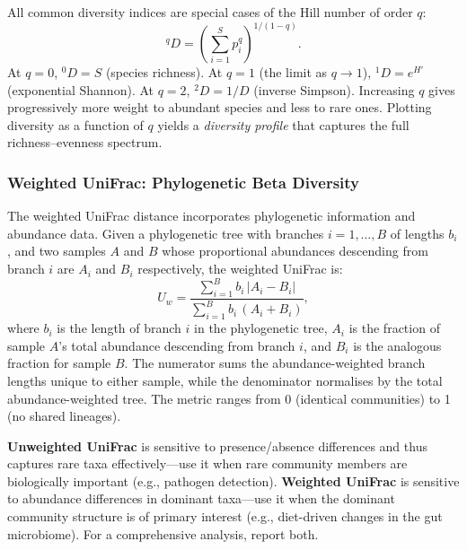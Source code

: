 \begin{keyconcept}[title={Hill Numbers: A Unified Diversity Framework}]
All common diversity indices are special cases of the Hill number of order $q$:
\begin{equation}
\label{eq:metagenomics:hill}
{}^{q}\!D = \left( \sum_{i=1}^{S} p_i^q \right)^{1/(1-q)}.
\end{equation}
At $q = 0$, ${}^{0}\!D = S$ (species richness). At $q = 1$ (the limit as $q \to 1$), ${}^{1}\!D = e^{H'}$ (exponential Shannon). At $q = 2$, ${}^{2}\!D = 1/D$ (inverse Simpson). Increasing $q$ gives progressively more weight to abundant species and less to rare ones. Plotting diversity as a function of $q$ yields a \emph{diversity profile} that captures the full richness--evenness spectrum.
\end{keyconcept}

\subsubsection{Weighted UniFrac: Phylogenetic Beta Diversity}

The weighted UniFrac distance incorporates phylogenetic information and abundance data. Given a phylogenetic tree with branches $i = 1, \ldots, B$ of lengths $b_i$, and two samples $A$ and $B$ whose proportional abundances descending from branch $i$ are $A_i$ and $B_i$ respectively, the weighted UniFrac is:
\begin{equation}
\label{eq:metagenomics:weighted_unifrac}
U_w = \frac{\sum_{i=1}^{B} b_i \, |A_i - B_i|}{\sum_{i=1}^{B} b_i \, (A_i + B_i)},
\end{equation}
where $b_i$ is the length of branch $i$ in the phylogenetic tree, $A_i$ is the fraction of sample $A$'s total abundance descending from branch $i$, and $B_i$ is the analogous fraction for sample $B$. The numerator sums the abundance-weighted branch lengths unique to either sample, while the denominator normalises by the total abundance-weighted tree. The metric ranges from 0 (identical communities) to 1 (no shared lineages).

\begin{tipbox}[title={Choosing Between Unweighted and Weighted UniFrac}]
\textbf{Unweighted UniFrac} is sensitive to presence/absence differences and thus captures rare taxa effectively---use it when rare community members are biologically important (e.g., pathogen detection). \textbf{Weighted UniFrac} is sensitive to abundance differences in dominant taxa---use it when the dominant community structure is of primary interest (e.g., diet-driven changes in the gut microbiome). For a comprehensive analysis, report both.
\end{tipbox}

